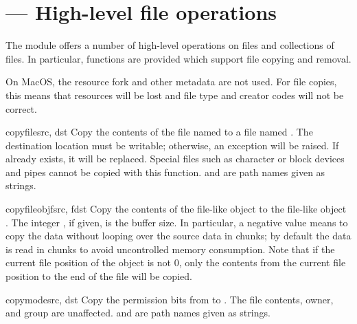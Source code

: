 \section{ ---
         High-level file operations}



The  module offers a number of high-level operations on
files and collections of files.  In particular, functions are provided 
which support file copying and removal.

  On MacOS, the resource fork and other metadata are
not used.  For file copies, this means that resources will be lost and 
file type and creator codes will not be correct.


\begin{funcdesc}{copyfile}{src, dst}
  Copy the contents of the file named  to a file named
  .  The destination location must be writable; otherwise, 
  an  exception will be raised.
  If  already exists, it will be replaced.  
  Special files such as character or block devices
  and pipes cannot be copied with this function.   and
   are path names given as strings.
\end{funcdesc}

\begin{funcdesc}{copyfileobj}{fsrc, fdst}
  Copy the contents of the file-like object  to the
  file-like object .  The integer , if given,
  is the buffer size. In particular, a negative  value
  means to copy the data without looping over the source data in
  chunks; by default the data is read in chunks to avoid uncontrolled
  memory consumption. Note that if the current file position of the
   object is not 0, only the contents from the current file
  position to the end of the file will be copied.
\end{funcdesc}

\begin{funcdesc}{copymode}{src, dst}
  Copy the permission bits from  to .  The file
  contents, owner, and group are unaffected.   and 
  are path names given as strings.
\end{funcdesc}

